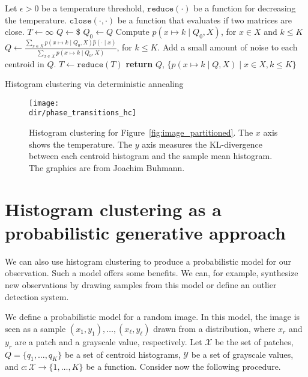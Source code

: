 \begin{algorithm}
\begin{algorithmic}[1]
\State Let
\State \qquad $\epsilon > 0$ be a temperature threshold,
\State \qquad $\texttt{reduce}(\cdot)$ be a function for decreasing the temperature.
\State \qquad $\texttt{close}\left(\cdot, \cdot\right)$ be a function that evaluates if two matrices are close.
\State $T \gets \infty$ 
\State $Q \gets \$$ 
\Repeat
\State $Q_0 \gets Q$
\State Compute $p\left(x \mapsto k \mid Q_0, X\right)$, for $x \in X$ and $k \leq K$
\State $\displaystyle Q \gets \frac{\sum_{x \in X} p\left(x \mapsto k \mid Q_0, X\right) \hat{p}\left(\cdot \mid x\right)}{\sum_{x \in X} p\left(x \mapsto k \mid Q_0, X\right)}$, for $k \leq K$.
\State Add a small amount of noise to each centroid in $Q$.
\State $T \gets \texttt{reduce}(T)$
\EndWhile
\State \textbf{return} $Q$, $\{p\left(x \mapsto k \mid Q, X\right) \mid x \in X, k \leq K\}$
\EndFunction
\end{algorithmic}
\caption{Histogram clustering via deterministic annealing}
\label{algo:histo_cluster}
\end{algorithm}

\begin{figure}[hbtp]
\centering
\texttt{[image: \\dir/phase\_transitions\_hc]}
\caption{Histogram clustering for Figure~\ref{fig:image_partitioned}. The $x$ axis shows the temperature. The $y$ axis measures the KL-divergence between each centroid histogram and the sample mean histogram. The graphics are from Joachim Buhmann.}
\label{fig:phase_transitions_hc}
\end{figure}

\section{Histogram clustering as a probabilistic generative approach}

We can also use histogram clustering to produce a probabilistic model for
our observation. Such a model offers some benefits. We can, for example,
synthesize new observations by drawing samples from this model or define
an outlier detection system.

We define a probabilistic model for a random image. In this model, the
image is seen as a sample $(x_1, y_1), \ldots, (x_\ell, y_\ell)$ drawn from a distribution,
where $x_r$ and $y_r$ are a patch and a grayscale value, respectively. Let $\mathcal{X}$ be
the set of patches, $Q = \{q_1, \ldots, q_K\}$ be a set of centroid histograms, $\mathcal{Y}$ be
a set of grayscale values, and $c: \mathcal{X} \to \{1,\ldots, K\}$ be a function. Consider
now the following procedure.

